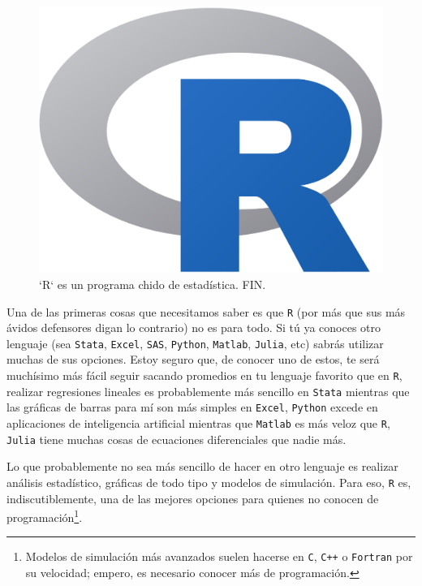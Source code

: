 \documentclass[
]{book}
\begin{document}
\begin{figure}

{\centering \includegraphics[width=17.78in]{images/rlogo} 

}

\caption{`R` es un programa chido de estadística. FIN.}\label{fig:unnamed-chunk-20}
\end{figure}

Una de las primeras cosas que necesitamos saber es que \texttt{R} (por más que sus más ávidos defensores digan lo contrario) no es para todo. Si tú ya conoces otro lenguaje (sea \texttt{Stata}, \texttt{Excel}, \texttt{SAS}, \texttt{Python}, \texttt{Matlab}, \texttt{Julia}, etc) sabrás utilizar muchas de sus opciones. Estoy seguro que, de conocer uno de estos, te será muchísimo más fácil seguir sacando promedios en tu lenguaje favorito que en \texttt{R}, realizar regresiones lineales es probablemente más sencillo en \texttt{Stata} mientras que las gráficas de barras para mí son más simples en \texttt{Excel}, \texttt{Python} excede en aplicaciones de inteligencia artificial mientras que \texttt{Matlab} es más veloz que \texttt{R}, \texttt{Julia} tiene muchas cosas de ecuaciones diferenciales que nadie más.

Lo que probablemente no sea más sencillo de hacer en otro lenguaje es realizar análisis estadístico, gráficas de todo tipo y modelos de simulación. Para eso, \texttt{R} es, indiscutiblemente, una de las mejores opciones para quienes no conocen de programación\footnote{Modelos de simulación más avanzados suelen hacerse en \texttt{C}, \texttt{C++} o \texttt{Fortran} por su velocidad; empero, es necesario conocer más de programación.}.
\end{document}

